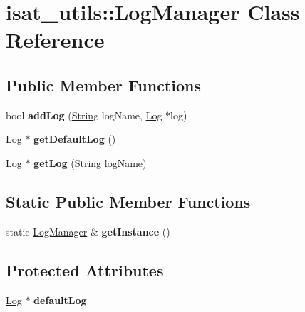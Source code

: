 \hypertarget{classisat__utils_1_1_log_manager}{}\section{isat\+\_\+utils\+:\+:Log\+Manager Class Reference}
\label{classisat__utils_1_1_log_manager}
\subsection*{Public Member Functions}
\begin{DoxyCompactItemize}
\item 
bool {\bfseries add\+Log} (\hyperlink{classisat__utils_1_1_string}{String} log\+Name, \hyperlink{classisat__utils_1_1_log}{Log} $\ast$log)\hypertarget{classisat__utils_1_1_log_manager_aa7f5be31af219b7402229d21d283cc89}{}\label{classisat__utils_1_1_log_manager_aa7f5be31af219b7402229d21d283cc89}

\item 
\hyperlink{classisat__utils_1_1_log}{Log} $\ast$ {\bfseries get\+Default\+Log} ()\hypertarget{classisat__utils_1_1_log_manager_a9d723b5d0600a13fa13f5ce325bb522a}{}\label{classisat__utils_1_1_log_manager_a9d723b5d0600a13fa13f5ce325bb522a}

\item 
\hyperlink{classisat__utils_1_1_log}{Log} $\ast$ {\bfseries get\+Log} (\hyperlink{classisat__utils_1_1_string}{String} log\+Name)\hypertarget{classisat__utils_1_1_log_manager_a878a4eb7d28026d3dbae8cee2a118356}{}\label{classisat__utils_1_1_log_manager_a878a4eb7d28026d3dbae8cee2a118356}

\end{DoxyCompactItemize}
\subsection*{Static Public Member Functions}
\begin{DoxyCompactItemize}
\item 
static \hyperlink{classisat__utils_1_1_log_manager}{Log\+Manager} \& {\bfseries get\+Instance} ()\hypertarget{classisat__utils_1_1_log_manager_a66ce07ec98bb58794573ef324735cf8a}{}\label{classisat__utils_1_1_log_manager_a66ce07ec98bb58794573ef324735cf8a}

\end{DoxyCompactItemize}
\subsection*{Protected Attributes}
\begin{DoxyCompactItemize}
\item 
\hyperlink{classisat__utils_1_1_log}{Log} $\ast$ {\bfseries default\+Log}\hypertarget{classisat__utils_1_1_log_manager_a2bd75c3efdf4bffdf1e43465639a8a1c}{}\label{classisat__utils_1_1_log_manager_a2bd75c3efdf4bffdf1e43465639a8a1c}

\end{DoxyCompactItemize}


